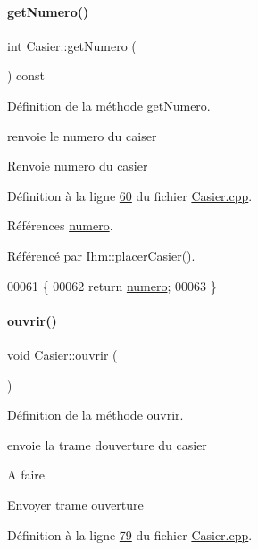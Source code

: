 \paragraph{\texorpdfstring{get\+Numero()}{getNumero()}}
{\footnotesize\ttfamily int Casier\+::get\+Numero (\begin{DoxyParamCaption}{ }\end{DoxyParamCaption}) const}



Définition de la méthode get\+Numero. 

renvoie le numero du caiser \begin{DoxyReturn}{Renvoie}
numero du casier 
\end{DoxyReturn}


Définition à la ligne \hyperlink{_casier_8cpp_source_l00060}{60} du fichier \hyperlink{_casier_8cpp_source}{Casier.\+cpp}.



Références \hyperlink{_casier_8h_source_l00044}{numero}.



Référencé par \hyperlink{_ihm_8cpp_source_l00087}{Ihm\+::placer\+Casier()}.


\begin{DoxyCode}
00061 \{
00062     \textcolor{keywordflow}{return} \hyperlink{class_casier_a17aa23e73b177559266a9fb17f63b812}{numero};
00063 \}
\end{DoxyCode}
\mbox{\label{class_casier_ac4b0de3ba58dc2bab52b049b278f4f90}} 
\paragraph{\texorpdfstring{ouvrir()}{ouvrir()}}
{\footnotesize\ttfamily void Casier\+::ouvrir (\begin{DoxyParamCaption}{ }\end{DoxyParamCaption})}



Définition de la méthode ouvrir. 

envoie la trame d\textquotesingle{}ouverture du casier \begin{DoxyRefDesc}{A faire}
\item[\hyperlink{todo__todo000004}{A faire}]Envoyer trame ouverture \end{DoxyRefDesc}


Définition à la ligne \hyperlink{_casier_8cpp_source_l00079}{79} du fichier \hyperlink{_casier_8cpp_source}{Casier.\+cpp}.


